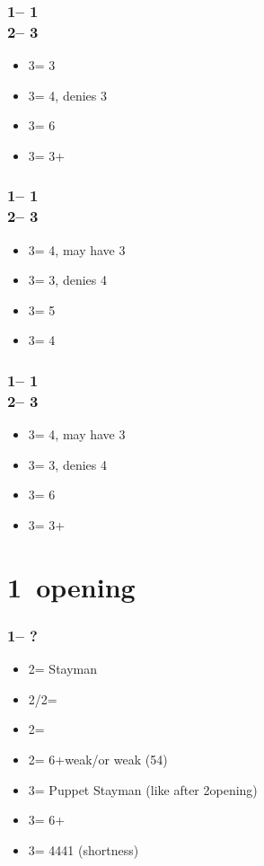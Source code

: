 \subsubsection*{1\diams -- 1\hearts \\ 2\nt -- 3\clubs}
\begin{itemize}
    \item 3\diams = 3\hearts
    \item 3\hearts = 4\spades, denies 3\hearts
    \item 3\spades = 6\diams
    \item 3\nt = 3+\clubs
\end{itemize}

\subsubsection*{1\clubs -- 1\spades \\ 2\nt -- 3\clubs}
\begin{itemize}
    \item 3\diams = 4\hearts, may have 3\spades
    \item 3\hearts = 3\spades, denies 4\hearts
    \item 3\spades = 5\clubs
    \item 3\nt = 4\diams
\end{itemize}

\subsubsection*{1\diams -- 1\spades \\ 2\nt -- 3\clubs}
\begin{itemize}
    \item 3\diams = 4\hearts, may have 3\spades
    \item 3\hearts = 3\spades, denies 4\hearts
    \item 3\spades = 6\diams
    \item 3\nt = 3+\clubs
\end{itemize}

\section{\texorpdfstring{1\ntx\ opening}{1ntOpening_KacperVersion}}\label{sec:1ntOpening_KacperVersion}

\subsubsection*{1\nt -- ?}
\begin{itemize}
    \item 2\clubs = Stayman
    \item 2\diams/2\hearts = \then \major
    \item 2\spades = \then \clubs
    \item 2\nt = 6+\diams weak/\gf or \minor weak (54)
    \item 3\clubs = Puppet Stayman (like after 2\nt opening) \imp
    \item 3\diams = 6+\diams\ \inv
    \item 3\major = 4441 (\major shortness) \gf \qq
\end{itemize}

